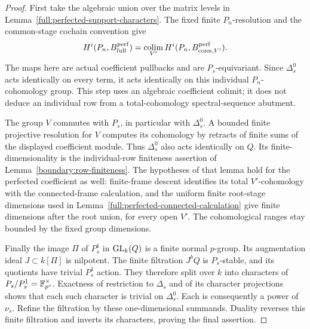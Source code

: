 \begin{proof}
First take the algebraic union over the matrix levels in
Lemma~\ref{full:perfected-support-characters}.
The fixed finite $P_n$-resolution and the common-stage
cochain convention give
\[
 H^i(P_n,B_{\mathrm{full}}^{\mathrm{perf}})
    =\operatorname*{colim}_{V'} H^i(P_n,B_{\mathrm{conn},V'}^{\mathrm{perf}}).
\]
The maps here are actual coefficient pullbacks and are
$P_s$-equivariant.
Since $\Delta_s^0$ acts identically on every term, it acts
identically on this individual $P_n$-cohomology group.
This step uses an algebraic coefficient colimit; it does
not deduce an individual row from a total-cohomology
spectral-sequence abutment.

The group $V$ commutes with $P_s$, in particular with
$\Delta_s^0$.  A bounded finite projective resolution for
$V$ computes its cohomology by retracts of finite sums of
the displayed coefficient module.  Thus $\Delta_s^0$
also acts identically on $Q$.
Its finite-dimensionality is the individual-row finiteness
assertion of Lemma~\ref{boundary:row-finiteness}.
The hypotheses of that lemma hold for the perfected
coefficient as well: finite-frame descent identifies its
total $V'$-cohomology with the connected-frame calculation,
and the uniform finite root-stage dimensions used in
Lemma~\ref{full:perfected-connected-calculation} give finite
dimensions after the root union, for every open $V'$.
The cohomological ranges stay bounded by the fixed group
dimensions.

Finally the image $\Pi$ of $P_s^1$ in $\operatorname{GL}_k(Q)$ is a finite
normal $p$-group.  Its augmentation ideal $J\subset k[\Pi]$
is nilpotent.  The finite filtration $J^bQ$ is $P_s$-stable,
and its quotients have trivial $P_s^1$ action.
They therefore split over $k$ into characters of
$P_s/P_s^1=\mathbb F_{p^s}^\times$.
Exactness of restriction to $\Delta_s$ and of its character
projections shows that each such character is trivial on
$\Delta_s^0$.  Each is consequently a power of $\nu_s$.
Refine the filtration by these one-dimensional summands.
Duality reverses this finite filtration and inverts its
characters, proving the final assertion.
\end{proof}
